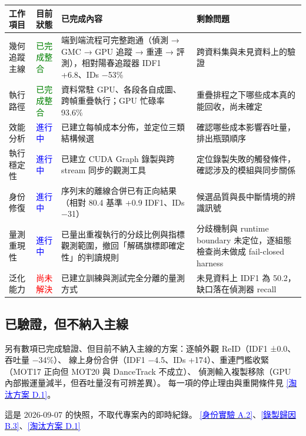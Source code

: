 \documentclass[10pt,a4paper]{ctexart}
\newcommand{\applink}[2]{\hyperref[#1]{\textcolor{Blue}{[#2]}}}
\newcommand{\tighttable}{\small\setlength{\tabcolsep}{4pt}}
\begin{document}
\tighttable
\begin{tabularx}{\linewidth}{@{}P{23mm}B{20mm}P{44mm}Y@{}}
\toprule
工作項目 & 目前狀態 & 已完成內容 & 剩餘問題\\
\midrule
幾何追蹤主線 & \textcolor{Green}{已完成整合} &
端到端流程可完整跑通（偵測 → GMC → GPU 追蹤 → 重連 → 評測），相對陽春追蹤器 IDF1 +6.8、IDs −53\% &
跨資料集與未見資料上的驗證\\
執行路徑 & \textcolor{Green}{已完成整合} &
資料常駐 GPU、各段各自成圖、跨幀重疊執行；GPU 忙碌率 93.6\% &
重疊排程之下哪些成本真的能回收，尚未確定\\
效能分析 & \textcolor{Blue}{進行中} &
已建立每幀成本分佈，並定位三類結構候選 &
確認哪些成本影響吞吐量，排出瓶頸順序\\
執行穩定性 & \textcolor{Blue}{進行中} &
已建立 CUDA Graph 錄製與跨 stream 同步的觀測工具 &
定位錄製失敗的觸發條件，確認涉及的模組與同步關係\\
身份修復 & \textcolor{Blue}{進行中} &
序列末的離線合併已有正向結果（相對 80.4 基準 +0.9 IDF1、IDs −31） &
候選品質與長中斷情境的辨識訊號\\
量測重現性 & \textcolor{Blue}{進行中} &
已量出重複執行的分歧比例與指標觀測範圍，撤回「解碼旗標即確定性」的判讀規則 &
分歧機制與 runtime boundary 未定位，逐組態檢查尚未做成 fail-closed harness\\
泛化能力 & \textcolor{Red}{尚未解決} &
已建立訓練與測試完全分離的量測方式 &
未見資料上 IDF1 為 50.2，缺口落在偵測器 recall\\
\bottomrule
\end{tabularx}

\subsection{已驗證，但不納入主線}

另有數項已完成驗證、但目前不納入主線的方案：逐幀外觀 ReID（IDF1 ±0.0、吞吐量 −34\%）、
線上身份合併（IDF1 −4.5、IDs +174）、重連門檻收緊（MOT17 正向但 MOT20 與 DanceTrack 不成立）、
偵測輸入複製移除（GPU 內部搬運量減半，但吞吐量沒有可辨差異）。
每一項的停止理由與重開條件見 \applink{app:D1}{淘汰方案 D.1}。

\begin{note}
  這是 2026-09-07 的快照，不取代專案內的即時紀錄。
  \applink{app:A2}{身份實驗 A.2}、\applink{app:B3}{錄製歸因 B.3}、\applink{app:D1}{淘汰方案 D.1}
\end{note}

\newpage

\end{document}
